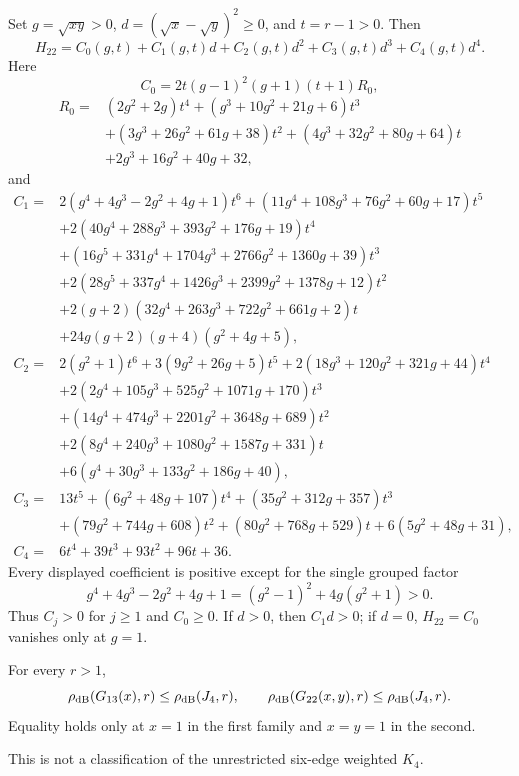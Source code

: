 Set $g=\sqrt{xy}>0$, $d=(\sqrt x-\sqrt y)^2\ge0$, and $t=r-1>0$.
Then
\[
 H_{22}=C_0(g,t)+C_1(g,t)d+C_2(g,t)d^2+C_3(g,t)d^3+C_4(g,t)d^4. \tag{B.5}\label{B.5}
\]
Here
\[
 C_0=2t(g-1)^2(g+1)(t+1)R_0,
\]
\[
\begin{aligned}
R_0={}&(2g^2+2g)t^4+(g^3+10g^2+21g+6)t^3\\
&+(3g^3+26g^2+61g+38)t^2+(4g^3+32g^2+80g+64)t\\
&+2g^3+16g^2+40g+32,
\end{aligned}
\]
and
\[
\begin{aligned}
C_1={}&2(g^4+4g^3-2g^2+4g+1)t^6
 +(11g^4+108g^3+76g^2+60g+17)t^5\\
&+2(40g^4+288g^3+393g^2+176g+19)t^4\\
&+(16g^5+331g^4+1704g^3+2766g^2+1360g+39)t^3\\
&+2(28g^5+337g^4+1426g^3+2399g^2+1378g+12)t^2\\
&+2(g+2)(32g^4+263g^3+722g^2+661g+2)t\\
&+24g(g+2)(g+4)(g^2+4g+5),\\[2pt]
C_2={}&2(g^2+1)t^6+3(9g^2+26g+5)t^5
 +2(18g^3+120g^2+321g+44)t^4\\
&+2(2g^4+105g^3+525g^2+1071g+170)t^3\\
&+(14g^4+474g^3+2201g^2+3648g+689)t^2\\
&+2(8g^4+240g^3+1080g^2+1587g+331)t\\
&+6(g^4+30g^3+133g^2+186g+40),\\[2pt]
C_3={}&13t^5+(6g^2+48g+107)t^4+(35g^2+312g+357)t^3\\
&+(79g^2+744g+608)t^2+(80g^2+768g+529)t
 +6(5g^2+48g+31),\\
C_4={}&6t^4+39t^3+93t^2+96t+36.
\end{aligned}
\]
Every displayed coefficient is positive except for the single grouped factor
\[
 g^4+4g^3-2g^2+4g+1=(g^2-1)^2+4g(g^2+1)>0.                  \tag{B.6}\label{B.6}
\]
Thus $C_j>0$ for $j\ge1$ and $C_0\ge0$.  If $d>0$, then $C_1d>0$; if $d=0$,
$H_{22}=C_0$ vanishes only at $g=1$.

\begin{theorem}\label{thm:k4}
For every $r>1$,
\[
 \rho_{\mathrm{dB}}(G_{13}(x),r)\le\rho_{\mathrm{dB}}(J_4,r),\qquad
 \rho_{\mathrm{dB}}(G_{22}(x,y),r)\le\rho_{\mathrm{dB}}(J_4,r).
\]
Equality holds only at $x=1$ in the first family and $x=y=1$ in the second.
\end{theorem}

This is not a classification of the unrestricted six-edge weighted $K_4$.
